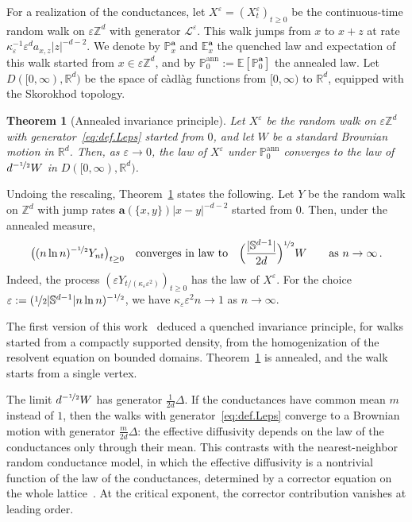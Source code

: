 \documentclass[11pt]{amsart}
\newtheorem{theorem}{Theorem}[section]
\numberwithin{equation}{section}
\newcommand{\Z}{\mathbb{Z}}
\newcommand{\R}{\mathbb{R}}
\newcommand{\E}{\mathbb{E}}
\newcommand{\PP}{\mathbb{P}}
\newcommand{\ba}{\mathbf{a}}
\newcommand{\eps}{\varepsilon}
\newcommand{\Leps}{\mathcal{L}^\varepsilon}
\newcommand{\nf}{\nicefrac}
\begin{document}
For a realization of the conductances, let $X^\eps = (X^\eps_t)_{t \geq 0}$ be the continuous-time random walk on $\eps \Z^d$ with generator $\Leps$.
This walk jumps from $x$ to $x + z$ at rate $\kappa_\eps^{-1} \eps^d a_{x,z} |z|^{-d-2}$.
We denote by $\PP^\ba_x$ and $\E^\ba_x$ the quenched law and expectation of this walk started from $x \in \eps \Z^d$, and by $\PP^{\mathrm{ann}}_0 := \E[\PP^\ba_0]$ the annealed law.
Let $D([0, \infty), \R^d)$ be the space of c\`adl\`ag functions from $[0,\infty)$ to $\R^d$, equipped with the Skorokhod topology.

\begin{theorem}[Annealed invariance principle] \label{thm:IP}
Let $X^\eps$ be the random walk on $\eps \Z^d$ with generator~\eqref{eq:def.Leps} started from $0$, and let $W$ be a standard Brownian motion in $\R^d$.
Then, as $\eps \to 0$, the law of $X^\eps$ under $\PP^{\mathrm{ann}}_0$ converges to the law of $d^{-\nf12} W$ in $D([0, \infty), \R^d)$.
\end{theorem}

Undoing the rescaling, Theorem~\ref{thm:IP} states the following.
Let $Y$ be the random walk on $\Z^d$ with jump rates $\ba(\{x,y\}) |x-y|^{-d-2}$ started from $0$.
Then, under the annealed measure,
\begin{equation*}
    \bigl( (n \ln n)^{-\nf12} Y_{nt} \bigr)_{t \geq 0} \quad \text{converges in law to} \quad \Bigl( \frac{|\mathbb{S}^{d-1}|}{2d} \Bigr)^{\nf12} W \qquad \text{as } n \to \infty\,.
\end{equation*}
Indeed, the process $(\eps Y_{t/(\kappa_\eps \eps^2)})_{t \geq 0}$ has the law of $X^\eps$.
For the choice $\eps := (\nf12 |\mathbb{S}^{d-1}| n \ln n)^{-\nf12}$, we have $\kappa_\eps \eps^2 n \to 1$ as $n \to \infty$.

The first version of this work~\citep{BD2026} deduced a quenched invariance principle, for walks started from a compactly supported density, from the homogenization of the resolvent equation on bounded domains.
Theorem~\ref{thm:IP} is annealed, and the walk starts from a single vertex.

The limit $d^{-\nf12} W$ has generator $\frac{1}{2d} \Delta$.
If the conductances have common mean $m$ instead of $1$, then the walks with generator~\eqref{eq:def.Leps} converge to a Brownian motion with generator $\frac{m}{2d} \Delta$: the effective diffusivity depends on the law of the conductances only through their mean.
This contrasts with the nearest-neighbor random conductance model, in which the effective diffusivity is a nontrivial function of the law of the conductances, determined by a corrector equation on the whole lattice~\citep{Kozlov1979, PapanicolaouVaradhan1981}.
At the critical exponent, the corrector contribution vanishes at leading order.
\end{document}
